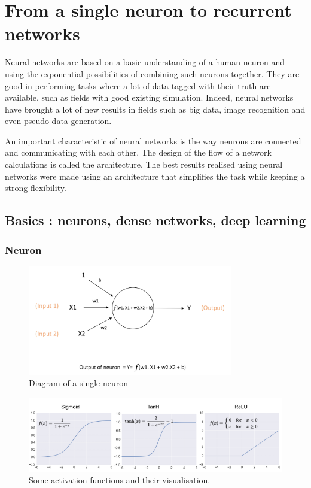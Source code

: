 \section{From a single neuron to recurrent networks}
\label{sec:NN}
Neural networks are based on a basic understanding of a human neuron and using the exponential possibilities of combining such neurons together.
They are good in performing tasks where a lot of data tagged with their truth are available, such as fields with good existing simulation.
Indeed, neural networks have brought a lot of new results in fields such as big data, image recognition and even pseudo-data generation.

An important characteristic of neural networks is the way neurons are connected and communicating with each other. The design of the flow of a network calculations is called the architecture. The best results realised using neural networks were made using an architecture that simplifies the task while keeping a strong flexibility.

\subsection{Basics : neurons, dense networks, deep learning}

\subsubsection{Neuron}

\begin{figure}
    \centering
    \includegraphics[width=0.8\textwidth]{Images/neuron_diagram}
    \caption{Diagram of a single neuron}
    \label{fig:neuron_diagram}
\end{figure}


\begin{figure}
    \centering
    \includegraphics[width=\textwidth]{Images/activation_functions.png}
    \caption{Some activation functions and their visualisation.}
    \label{fig:activation_functions}
\end{figure}


